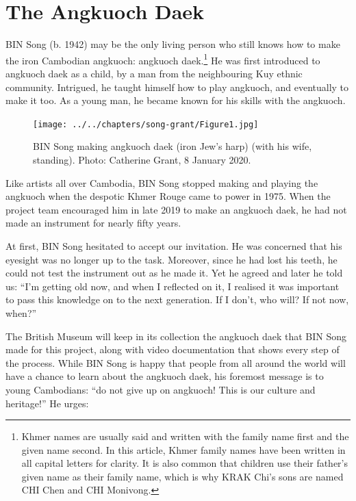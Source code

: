 \documentclass[twoside]{article}
\begin{document}
\hypertarget{the-angkuoch-daek}{%
\section*{The Angkuoch Daek}\label{the-angkuoch-daek}}

BIN Song (b. 1942) may be the only living person who still knows how to
make the iron Cambodian angkuoch: angkuoch daek.\footnote{Khmer names
  are usually said and written with the family name first and the given
  name second. In this article, Khmer family names have been written in
  all capital letters for clarity. It is also common that children use
  their father's given name as their family name, which is why KRAK
  Chi's sons are named CHI Chen and CHI Monivong.} He was first
introduced to angkuoch daek as a child, by a man from the neighbouring
Kuy ethnic community. Intrigued, he taught himself how to play angkuoch,
and eventually to make it too. As a young man, he became known for his
skills with the angkuoch.

\begin{figure}
  \texttt{[image: ../../chapters/song-grant/Figure1.jpg]}
  \caption{BIN Song making angkuoch
  daek (iron Jew's harp) (with his wife, standing). Photo: Catherine
  Grant, 8 January 2020.}
\end{figure}

Like artists all over Cambodia, BIN Song stopped making and playing the
angkuoch when the despotic Khmer Rouge came to power in 1975. When the
project team encouraged him in late 2019 to make an angkuoch daek, he
had not made an instrument for nearly fifty years.

At first, BIN Song hesitated to accept our invitation. He was concerned
that his eyesight was no longer up to the task. Moreover, since he had
lost his teeth, he could not test the instrument out as he made it. Yet
he agreed and later he told us: ``I'm getting old now, and when I
reflected on it, I realised it was important to pass this knowledge on
to the next generation. If I don't, who will? If not now, when?''

The British Museum will keep in its collection the angkuoch daek that
BIN Song made for this project, along with video documentation that
shows every step of the process. While BIN Song is happy that people
from all around the world will have a chance to learn about the angkuoch
daek, his foremost message is to young Cambodians: ``do not give up on
angkuoch! This is our culture and heritage!'' He urges:
\end{document}
